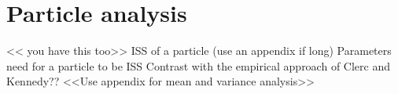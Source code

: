 \section{Particle analysis}
\label{sec:particle}

<< you have this too>>
ISS of a particle (use an appendix if long)
Parameters need for a particle to be ISS
Contrast with the empirical approach of Clerc and Kennedy??
<<Use appendix for mean and variance analysis>>